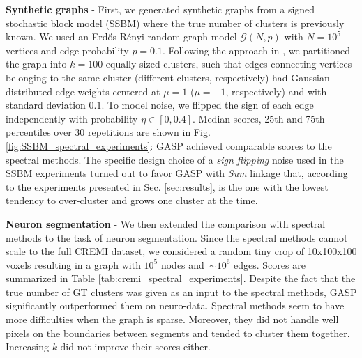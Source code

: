 \textbf{Synthetic graphs} - First, we generated synthetic graphs from a signed stochastic block model (SSBM) where the true number of clusters is previously known. We used an Erd\H os-R\'enyi random graph model $\mathcal{G}(N,p)$ with $N=10^5$ vertices and edge probability $p=0.1$. Following the approach in \cite{Cucuringu2019SPONGEAG}, we partitioned the graph into $k=100$ equally-sized clusters, such that edges connecting vertices belonging to the same cluster (different clusters, respectively) had Gaussian distributed edge weights centered at $\mu=1$ ($\mu=-1$, respectively) and with standard deviation $0.1$. To model noise, we flipped the sign of each edge independently with probability $\eta \in [0, 0.4]$. Median scores, 25th and 75th percentiles over 30 repetitions are shown in Fig. \ref{fig:SSBM_spectral_experiments}: GASP achieved comparable scores to the spectral methods. The specific design choice of a \emph{sign flipping} noise used in the SSBM experiments turned out to favor GASP with \emph{Sum} linkage that, according to the experiments presented in Sec. \ref{sec:results}, is the one with the lowest tendency to over-cluster and grows one cluster at the time.

\textbf{Neuron segmentation} - We then extended the comparison with spectral methods to the task of neuron segmentation. Since the spectral methods cannot scale to the full CREMI dataset, we considered a random tiny crop of 10x100x100 voxels resulting in a graph with $10^5$ nodes and~$\sim10^6$ edges. Scores are summarized in Table \ref{tab:cremi_spectral_experiments}.
Despite the fact that the true number of GT clusters was given as an input to the spectral methods, GASP significantly outperformed them on neuro-data. Spectral methods seem to have more difficulties when the graph is sparse. Moreover, they did not handle well pixels on the boundaries between segments and tended to cluster them together. Increasing $k$ did not improve their scores either.


